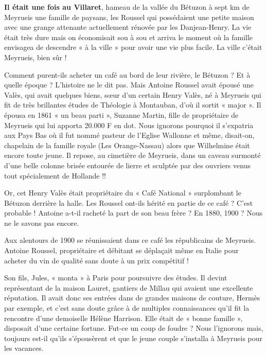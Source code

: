 
\textbf{Il était une fois au Villaret}, hameau de la vallée du Bétuzon à sept km de Meyrueis une
famille de paysans, les Roussel qui possédaient une petite maison avec une grange attenante
actuellement rénovée par les Danjean-Henry. La vie était très dure mais on économisait sou
à sou et arriva le moment où la famille envisagea de descendre « à la ville » pour avoir une
vie plus facile. La ville c’était Meyrueis, bien sûr !

\medskip

Comment purent-ils acheter un café au bord de leur rivière, le Bétuzon ? Et à quelle époque ?
L’histoire ne le dit pas. Mais Antoine Roussel avait épousé une Valès, qui avait quelques
biens, sœur d’un certain Henry Valès, né à Meyrueis qui fit de très brillantes études de
Théologie à Montauban, d’où il sortit « major ». Il épousa en 1861 « un beau parti », Suzanne
Martin, fille de propriétaire de Meyrueis qui lui apporta 20.000 F en dot. Nous ignorons
pourquoi il s’expatria aux Pays Bas où il fut nommé pasteur de l’Eglise Wallonne et même,
disait-on, chapelain de la famille royale (Les Orange-Nassau) alors que Wilhelmine était
encore toute jeune. Il repose, au cimetière de Meyrueis, dans un caveau surmonté d’une belle
colonne brisée entourée de lierre et sculptée par des ouvriers venus tout spécialement de
Hollande !!

\medskip

Or, cet Henry Valès était propriétaire du « Café National » surplombant le Bétuzon derrière la
halle. Les Roussel ont-ils hérité en partie de ce café ? C’est probable ! Antoine a-t-il racheté la
part de son beau frère ? En 1880, 1900 ? Nous ne le savons pas encore.

\medskip

Aux alentours de 1900 se réunissaient dans ce café les républicains de Meyrueis. Antoine
Roussel, propriétaire et débitant se déplaçait même en Italie pour acheter du vin de qualité
sans doute à un prix compétitif !

\medskip

Son fils, Jules, « monta » à Paris pour poursuivre des études. Il devint représentant de la
maison Lauret, gantiers de Millau qui avaient une excellente réputation. Il avait donc ses
entrées dans de grandes maisons de couture, Hermès par exemple, et c’est sans doute grâce à
de multiples connaissances qu’il fit la rencontre d’une demoiselle Hélène Harrison. Elle était
de « bonne famille », disposait d’une certaine fortune. Fut-ce un coup de foudre ? Nous
l’ignorons mais, toujours est-il qu’ils s’épousèrent et que le jeune couple s’installa à Meyrueis
pour les vacances.

